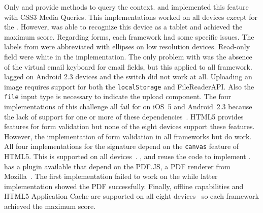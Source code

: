 \documentclass[a4paper]{artikel3}
\newcommand{\code}[1]{\texttt{#1}}
\begin{document}
Only \sta{} and \kendoa{} provide methods to query the context.
\jqma{} and \lungo{} implemented this feature with CSS3 Media Queries.
This implementations worked on all devices except for the \gtab.
However,  \kendoa{} was able to recognize this device as a tablet and achieved the maximum score.
Regarding forms,  each framework had some specific issues.
The labels from \sta{} were abbreviated with ellipses on low resolution devices.
Read-only field were white in the \kendoa{} implementation.
The only problem with \jqma{} was the absence of the virtual email keyboard for email fields,  but this applied to all framework. 
\lungo{} lagged on Android 2.3 devices and the switch did not work at all.
Uploading an image requires support for both the \code{localStorage} and FileReaderAPI.  
Also the \code{file} input type is necessary to indicate the upload component.
The four implementations of this challenge all fail for on iOS~5 and Android~2.3 because the lack of support for one or more of these dependencies~\cite{Deveria2013c,ViljamiSalminen2012}.
HTML5 provides features for form validation but none of the eight devices support these features.
However, the implementation of form validation in all frameworks but \lungo{} do work.
All four implementations for the signature depend on the \code{canvas} feature of HTML5.
This is supported on all devices~\cite{Deveria2013c}.
\kendoa{}, \jqma{} and \lungo{} reuse the code to implement .
\sta{} has a plugin available that depend on the PDF.JS,  a PDF renderer from Mozilla~\cite{Gal2010}.
The first implementation failed to work on the \gs{} while latter implementation showed the PDF successfully.
Finally, offline capabilities and HTML5 Application Cache are supported on all eight devices~\cite{Deveria2013c} so each framework achieved the maximum score.
\end{document}
